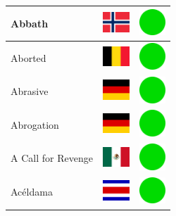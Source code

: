 \documentclass[12pt, a4paper, twoside]{report}
\begin{document}
\begin{center}
\begin{longtable}{|p{5cm}|p{2cm}|p{2cm}|}
 Abbath                                                     & \includegraphics[width=1cm]{../4x3/no} &   \includegraphics[width=1cm]{../likes/y} \\ \hline
 Aborted                                                    & \includegraphics[width=1cm]{../4x3/be} &   \includegraphics[width=1cm]{../likes/y} \\ \hline
 Abrasive                                                   & \includegraphics[width=1cm]{../4x3/de} &   \includegraphics[width=1cm]{../likes/y} \\ \hline
 Abrogation                                                 & \includegraphics[width=1cm]{../4x3/de} &   \includegraphics[width=1cm]{../likes/y} \\ \hline
 A Call for Revenge                                         & \includegraphics[width=1cm]{../4x3/mx} &   \includegraphics[width=1cm]{../likes/y} \\ \hline
 Acéldama                                                   & \includegraphics[width=1cm]{../4x3/cr} &   \includegraphics[width=1cm]{../likes/y} \\ \hline

\end{longtable}
\end{center}
\end{document}

